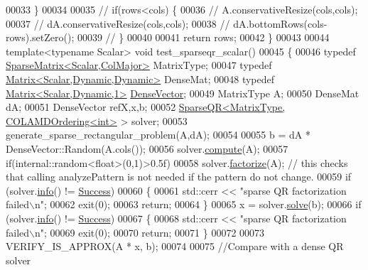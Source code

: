 \begin{DoxyCode}
00033   \}
00034   
00035 \textcolor{comment}{//   if(rows<cols) \{}
00036 \textcolor{comment}{//     A.conservativeResize(cols,cols);}
00037 \textcolor{comment}{//     dA.conservativeResize(cols,cols);}
00038 \textcolor{comment}{//     dA.bottomRows(cols-rows).setZero();}
00039 \textcolor{comment}{//   \}}
00040   
00041   \textcolor{keywordflow}{return} rows;
00042 \}
00043 
00044 \textcolor{keyword}{template}<\textcolor{keyword}{typename} Scalar> \textcolor{keywordtype}{void} test\_sparseqr\_scalar()
00045 \{
00046   \textcolor{keyword}{typedef} \hyperlink{group___sparse_core___module}{SparseMatrix<Scalar,ColMajor>} MatrixType; 
00047   \textcolor{keyword}{typedef} \hyperlink{group___core___module}{Matrix<Scalar,Dynamic,Dynamic>} DenseMat;
00048   \textcolor{keyword}{typedef} \hyperlink{group___core___module}{Matrix<Scalar,Dynamic,1>} \hyperlink{group___core___module}{DenseVector};
00049   MatrixType A;
00050   DenseMat dA;
00051   DenseVector refX,x,b; 
00052   \hyperlink{group___sparse_q_r___module_class_eigen_1_1_sparse_q_r}{SparseQR<MatrixType, COLAMDOrdering<int>} > solver; 
00053   generate\_sparse\_rectangular\_problem(A,dA);
00054   
00055   b = dA * DenseVector::Random(A.cols());
00056   solver.\hyperlink{group___sparse_q_r___module_aedaf52b7543de4d55c58c8f830c2aeb7}{compute}(A);
00057   \textcolor{keywordflow}{if}(internal::random<float>(0,1)>0.5f)
00058     solver.\hyperlink{group___sparse_q_r___module_a55a34bacf05bd30a1dacbccad9f03c6d}{factorize}(A);  \textcolor{comment}{// this checks that calling analyzePattern is not needed if the pattern
       do not change.}
00059   \textcolor{keywordflow}{if} (solver.\hyperlink{group___sparse_q_r___module_a234b0580aaf57237393f2e73a3d38690}{info}() != \hyperlink{group__enums_gga85fad7b87587764e5cf6b513a9e0ee5ea52581b035f4b59c203b8ff999ef5fcea}{Success})
00060   \{
00061     std::cerr << \textcolor{stringliteral}{"sparse QR factorization failed\(\backslash\)n"};
00062     exit(0);
00063     \textcolor{keywordflow}{return};
00064   \}
00065   x = solver.\hyperlink{group___sparse_q_r___module_aea13a2c6823cd8408ba49afde9b3d4e4}{solve}(b);
00066   \textcolor{keywordflow}{if} (solver.\hyperlink{group___sparse_q_r___module_a234b0580aaf57237393f2e73a3d38690}{info}() != \hyperlink{group__enums_gga85fad7b87587764e5cf6b513a9e0ee5ea52581b035f4b59c203b8ff999ef5fcea}{Success})
00067   \{
00068     std::cerr << \textcolor{stringliteral}{"sparse QR factorization failed\(\backslash\)n"};
00069     exit(0);
00070     \textcolor{keywordflow}{return};
00071   \}
00072   
00073   VERIFY\_IS\_APPROX(A * x, b);
00074   
00075   \textcolor{comment}{//Compare with a dense QR solver}

\end{DoxyCode}
